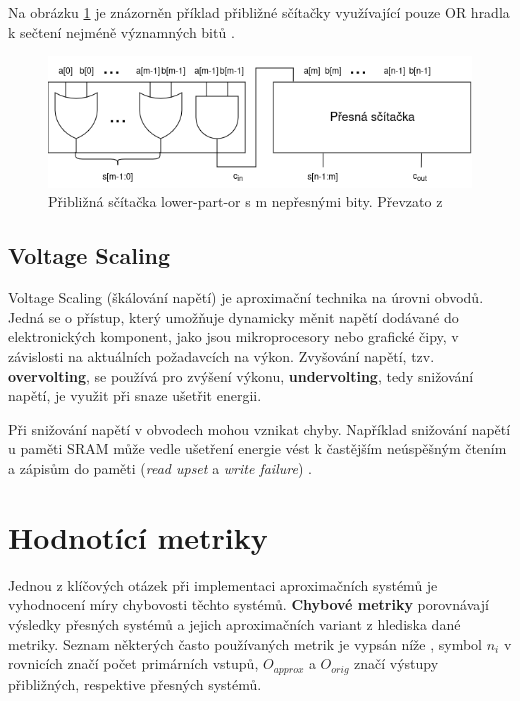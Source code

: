 Na obrázku \ref{fig:approx_adder} je znázorněn příklad přibližné sčítačky využívající pouze OR hradla k sečtení nejméně významných bitů \cite{log_mults}.

\begin{figure}[H]
    \centering
    \includegraphics[width=\textwidth]{obrazky-figures/scitacka.png}
    \caption{Přibližná sčítačka lower-part-or s m nepřesnými bity. Převzato z \cite{log_mults}}
    \label{fig:approx_adder}
\end{figure}

\subsection*{Voltage Scaling}
Voltage Scaling (škálování napětí) je aproximační technika na úrovni obvodů. Jedná se o přístup, který umožňuje dynamicky měnit napětí dodávané do elektronických komponent, jako jsou mikroprocesory nebo grafické čipy, v závislosti na aktuálních požadavcích na výkon. Zvyšování napětí, tzv. \textbf{overvolting}, se používá pro zvýšení výkonu, \textbf{undervolting}, tedy snižování napětí, je využit při snaze ušetřit energii.

Při snižování napětí v obvodech mohou vznikat chyby. Například snižování napětí u paměti SRAM může vedle ušetření energie vést k častějším neúspěšným čtením a zápisům do paměti (\textit{read upset} a \textit{write failure}) \cite{ac_techniques}.

\pagebreak

\section{Hodnotící metriky}
Jednou z klíčových otázek při implementaci aproximačních systémů je vyhodnocení míry chybovosti těchto systémů. \textbf{Chybové metriky} porovnávají výsledky přesných systémů a jejich aproximačních variant z hlediska dané metriky. Seznam některých často používaných metrik je vypsán níže \cite{circuit_library} \cite{error_metrics}, symbol $n_i$ v rovnicích značí počet primárních vstupů, $O_{approx}$ a $O_{orig}$ značí výstupy přibližných, respektive přesných systémů.

